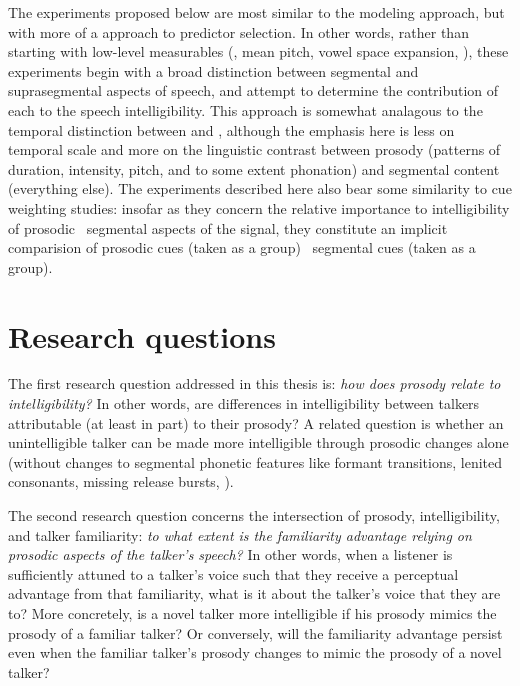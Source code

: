 The experiments proposed below are most similar to the modeling approach, but with more of a  approach to predictor selection.  In other words, rather than starting with low-level measurables (\eg, mean pitch, vowel space expansion, \etc), these experiments begin with a broad distinction between segmental and suprasegmental aspects of speech, and attempt to determine the contribution of each to the speech intelligibility.  This approach is somewhat analagous to the temporal distinction between  and  \citep{Rosen1992}, although the emphasis here is less on temporal scale and more on the linguistic contrast between prosody (patterns of duration, intensity, pitch, and to some extent phonation) and segmental content (everything else).  The experiments described here also bear some similarity to cue weighting studies: insofar as they concern the relative importance to intelligibility of prosodic \vs\ segmental aspects of the signal, they constitute an implicit comparision of prosodic cues (taken as a group) \vs\ segmental cues (taken as a group).

\section{Research questions}
The first research question addressed in this thesis is: {\em how does prosody relate to intelligibility?}  In other words, are differences in intelligibility between talkers attributable (at least in part) to their prosody?  A related question is whether an unintelligible talker can be made more intelligible through prosodic changes alone (without changes to segmental phonetic features like formant transitions, lenited consonants, missing release bursts, \etc).


The second research question concerns the intersection of prosody, intelligibility, and talker familiarity: {\em to what extent is the familiarity advantage relying on prosodic aspects of the talker’s speech?}  In other words, when a  listener is sufficiently attuned to a talker’s voice such that they receive a perceptual advantage from that familiarity, what is it about the talker’s voice that they are  to?  More concretely, is a novel talker more intelligible if his prosody mimics the prosody of a familiar talker?  Or conversely, will the familiarity advantage persist even when the familiar talker’s prosody changes to mimic the prosody of a novel talker?

